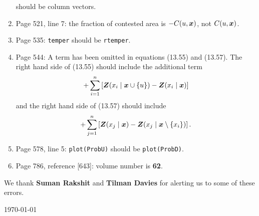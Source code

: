 \documentclass[12pt,a4paper]{article}
\newcommand{\boldmaths}[1]{{\ensuremath\boldsymbol{#1}}}
\newcommand{\bx}{\boldmaths x}
\newcommand{\bZ}{\boldmaths Z}
\begin{document}
\begin{enumerate}
should be column vectors.
\item Page 521, line 7: the fraction of contested area is $-C(u, \bx)$,
not $C(u,\bx)$.
\item Page 535: \texttt{temper} should be \texttt{rtemper}.
\item Page 544: A term has been omitted in equations (13.55) and (13.57).
The right hand side of (13.55) should include the additional term
\[
   + \sum_{i=1}^n \left[ \bZ(x_i \mid \bx \cup \{u\}) - \bZ(x_i \mid \bx) \right]
\]
and the right hand side of (13.57) should include
\[
  + \sum_{j=1}^n \left[ \bZ(x_j \mid \bx) - \bZ(x_j \mid \bx \setminus \{x_i\}) \right].
\]
\item Page 578, line 5: \texttt{plot(ProbU)} should be \texttt{plot(ProbD)}.
\item Page 786, reference [643]: volume number is \textbf{62}.
\end{enumerate}

We thank \textbf{Suman Rakshit} and \textbf{Tilman Davies}
for alerting us to some of these errors.\\

\vspace*{\fill}


\hspace*{\fill} \today
\end{document}
